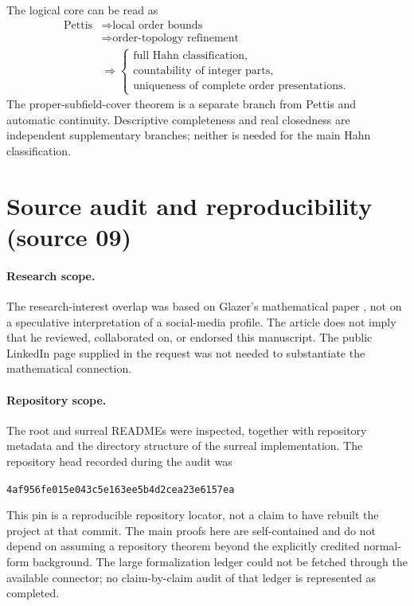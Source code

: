 \documentclass[11pt]{article}
\numberwithin{equation}{section}
\theoremstyle{definition}
\theoremstyle{remark}
\begin{document}
The logical core can be read as
\[
 \begin{aligned}
 \text{Pettis}
 &\Longrightarrow \text{local order bounds}\\
 &\Longrightarrow \text{order-topology refinement}\\
 &\Longrightarrow
 \begin{cases}
  \text{full Hahn classification},\\
  \text{countability of integer parts},\\
  \text{uniqueness of complete order presentations}.
 \end{cases}
 \end{aligned}
\]
The proper-subfield-cover theorem is a separate branch from Pettis and
automatic continuity. Descriptive completeness and real closedness are
independent supplementary branches; neither is needed for the main Hahn
classification.

\section{Source audit and reproducibility (source 09)}
\label{pma:ser:app:audit}

\paragraph{Research scope.}
The research-interest overlap was based on Glazer's mathematical paper
\cite{Glazer}, not on a speculative interpretation of a social-media profile.
The article does not imply that he reviewed, collaborated on, or endorsed
this manuscript. The public LinkedIn page supplied in the request was not
needed to substantiate the mathematical connection.

\paragraph{Repository scope.}
The root and surreal READMEs were inspected, together with repository
metadata and the directory structure of the surreal implementation.
The repository head recorded during the audit was
\begin{center}\small\texttt{4af956fe015e043c5e163ee5b4d2cea23e6157ea}\end{center}
This pin is a reproducible repository locator, not a claim to have rebuilt
the project at that commit. The main proofs here are self-contained and do
not depend on assuming a repository theorem beyond the explicitly credited
normal-form background. The large formalization ledger could not be fetched
through the available connector; no claim-by-claim audit of that ledger is
represented as completed.
\end{document}
